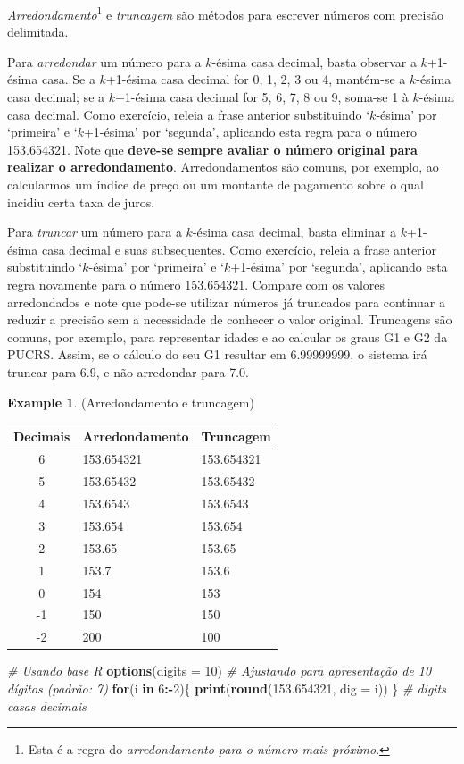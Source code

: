 \documentclass[
]{book}
\newenvironment{Shaded}{\begin{snugshade}}{\end{snugshade}}
\newcommand{\CommentTok}[1]{\textcolor[rgb]{0.56,0.35,0.01}{\textit{#1}}}
\newcommand{\ControlFlowTok}[1]{\textcolor[rgb]{0.13,0.29,0.53}{\textbf{#1}}}
\newcommand{\DataTypeTok}[1]{\textcolor[rgb]{0.13,0.29,0.53}{#1}}
\newcommand{\DecValTok}[1]{\textcolor[rgb]{0.00,0.00,0.81}{#1}}
\newcommand{\FloatTok}[1]{\textcolor[rgb]{0.00,0.00,0.81}{#1}}
\newcommand{\KeywordTok}[1]{\textcolor[rgb]{0.13,0.29,0.53}{\textbf{#1}}}
\newcommand{\NormalTok}[1]{#1}
\newcommand{\OperatorTok}[1]{\textcolor[rgb]{0.81,0.36,0.00}{\textbf{#1}}}
\theoremstyle{definition}
\theoremstyle{definition}
\newtheorem{example}{Example}[chapter]
\theoremstyle{definition}
\theoremstyle{remark}
\begin{document}
\emph{Arredondamento}\footnote{Esta é a regra do \emph{arredondamento para o número mais próximo}.} e \emph{truncagem} são métodos para escrever números com precisão delimitada.

Para \emph{arredondar} um número para a \(k\)-ésima casa decimal, basta observar a \(k\)+1-ésima casa. Se a \(k\)+1-ésima casa decimal for 0, 1, 2, 3 ou 4, mantém-se a \(k\)-ésima casa decimal; se a \(k\)+1-ésima casa decimal for 5, 6, 7, 8 ou 9, soma-se 1 à \(k\)-ésima casa decimal. Como exercício, releia a frase anterior substituindo `\(k\)-ésima' por `primeira' e `\(k\)+1-ésima' por `segunda', aplicando esta regra para o número 153.654321. Note que \textbf{deve-se sempre avaliar o número original para realizar o arredondamento}. Arredondamentos são comuns, por exemplo, ao calcularmos um índice de preço ou um montante de pagamento sobre o qual incidiu certa taxa de juros.

Para \emph{truncar} um número para a \(k\)-ésima casa decimal, basta eliminar a \(k\)+1-ésima casa decimal e suas subsequentes. Como exercício, releia a frase anterior substituindo `\(k\)-ésima' por `primeira' e `\(k\)+1-ésima' por `segunda', aplicando esta regra novamente para o número 153.654321. Compare com os valores arredondados e note que pode-se utilizar números já truncados para continuar a reduzir a precisão sem a necessidade de conhecer o valor original. Truncagens são comuns, por exemplo, para representar idades e ao calcular os graus G1 e G2 da PUCRS. Assim, se o cálculo do seu G1 resultar em 6.99999999, o sistema irá truncar para 6.9, e não arredondar para 7.0.

\begin{example}
\protect\hypertarget{exm:arred-trunc}{}{\label{exm:arred-trunc} }(Arredondamento e truncagem)

\begin{longtable}[]{@{}cll@{}}
\toprule
Decimais & Arredondamento & Truncagem\tabularnewline
\midrule
\endhead
6 & 153.654321 & 153.654321\tabularnewline
5 & 153.65432 & 153.65432\tabularnewline
4 & 153.6543 & 153.6543\tabularnewline
3 & 153.654 & 153.654\tabularnewline
2 & 153.65 & 153.65\tabularnewline
1 & 153.7 & 153.6\tabularnewline
0 & 154 & 153\tabularnewline
-1 & 150 & 150\tabularnewline
-2 & 200 & 100\tabularnewline
\bottomrule
\end{longtable}
\end{example}

\begin{Shaded}
\begin{Highlighting}[]
\CommentTok{\# Usando base R}
\KeywordTok{options}\NormalTok{(}\DataTypeTok{digits =} \DecValTok{10}\NormalTok{)            }\CommentTok{\# Ajustando para apresentação de 10 dígitos (padrão: 7)}
\ControlFlowTok{for}\NormalTok{(i }\ControlFlowTok{in} \DecValTok{6}\OperatorTok{:{-}}\DecValTok{2}\NormalTok{)\{ }\KeywordTok{print}\NormalTok{(}\KeywordTok{round}\NormalTok{(}\FloatTok{153.654321}\NormalTok{, }\DataTypeTok{dig =}\NormalTok{ i)) \}        }\CommentTok{\# \textquotesingle{}digits\textquotesingle{} casas decimais}
\end{Highlighting}
\end{Shaded}
\end{document}
